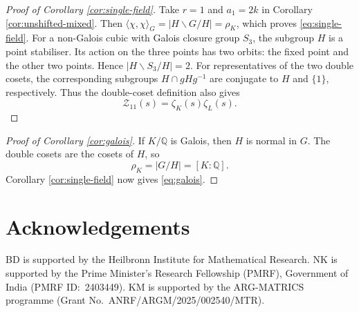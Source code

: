 \documentclass[11pt]{amsart}
\numberwithin{equation}{section}
\theoremstyle{plain}
\newcommand{\Q}{\mathbb{Q}}
\newcommand{\calZ}{\mathcal{Z}}
\begin{document}
\begin{proof}[Proof of Corollary \ref{cor:single-field}]
Take $r=1$ and $a_1=2k$ in Corollary
\ref{cor:unshifted-mixed}.  Then
$\langle\chi,\chi\rangle_G=|H\backslash G/H|=\rho_K$, which proves
\eqref{eq:single-field}.  For a non-Galois cubic with Galois closure group
$S_3$, the subgroup $H$ is a point stabiliser.  Its action on the three
points has two orbits: the fixed point and the other two points.  Hence
$|H\backslash S_3/H|=2$.  For representatives of the two double cosets,
the corresponding subgroups $H\cap gHg^{-1}$ are conjugate to $H$ and
$\{1\}$, respectively.  Thus the double-coset definition also gives
\begin{equation*}
\calZ_{11}(s)=\zeta_K(s)\zeta_L(s).
\end{equation*}
\end{proof}

\begin{proof}[Proof of Corollary \ref{cor:galois}]
If $K/\Q$ is Galois, then $H$ is normal in $G$.  The double cosets are the
cosets of $H$, so
\begin{equation*}
\rho_K=|G/H|=[K:\Q].
\end{equation*}
Corollary \ref{cor:single-field} now gives \eqref{eq:galois}.
\end{proof}

\section*{Acknowledgements}
BD is supported by the Heilbronn Institute for Mathematical Research.
NK is supported by the Prime Minister's Research Fellowship (PMRF),
Government of India (PMRF ID:~2403449).  KM is supported by the
ARG-MATRICS programme (Grant No.~ANRF/ARGM/2025/002540/MTR).
\end{document}
